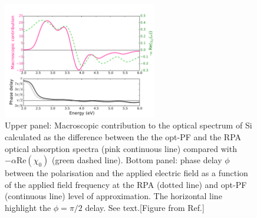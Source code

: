 \begin{figure}[ht]
\centering
\includegraphics[width=0.6\textwidth]{Figures/Analysis.pdf}
\caption{\footnotesize{Upper panel: Macroscopic contribution to the optical spectrum of Si calculated as the difference between the the opt-PF  and the RPA optical absorption spectra (pink continuous line) compared with $-\alpha \text{Re}(\chi_0)$ (green dashed line). Bottom panel: phase delay $\phi$ between the polarisation and the applied electric field as a function of the applied field frequency at the RPA (dotted line) and opt-PF (continuous line) level of approximation. The horizontal line highlight the $\phi =\pi/2$ delay. See text.[Figure from Ref.\cite{gruningtddf1}] }} \label{fg:epsanl}
\end{figure}


